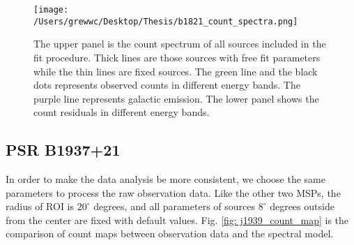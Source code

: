 \documentclass[12pt]{report}
\newcommand{\mycaption}[1]{\protect \caption{#1}}
\begin{document}
      
      
          \begin{figure}[!ht]
            \centering
            \texttt{[image: /Users/grewwc/Desktop/Thesis/b1821\_count\_spectra.png]}
            \caption{The upper panel is the count spectrum of all sources included in the 
                    fit procedure. Thick lines are those sources with free fit parameters 
                    while the thin lines are fixed sources. The green line and the black 
                    dots represents observed counts in different energy bands. The purple 
                    line represents galactic emission. The lower panel shows the count 
                    residuals in different energy bands. } 
            \label{fig: j0218_count_spectra}
          \end{figure}

        \subsection{PSR B1937+21}
          In order to make the data analysis be more consistent, we choose the same parameters
          to process the raw observation data. Like the other two MSPs, the radius of ROI is $20^{\circ}$ 
          degrees, and all parameters of sources $8^{\circ}$ degrees outside from the center 
          are fixed with default values. Fig. \ref{fig: j1939_count_map} is the 
          comparison of count maps between observation data and the spectral model. 
\end{document}
